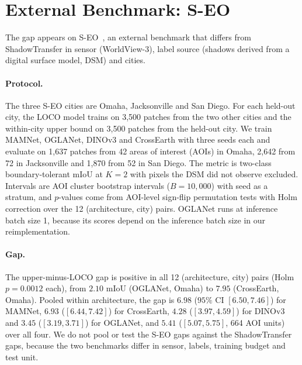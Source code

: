 \section{External Benchmark: S-EO}
\label{app:seo}

The gap appears on S-EO~\cite{seo}, an external benchmark that differs from ShadowTransfer
in sensor (WorldView-3), label source (shadows derived from a digital surface model, DSM)
and cities.

\paragraph{Protocol.} The three S-EO cities are Omaha, Jacksonville and San Diego. For each
held-out city, the LOCO model trains on 3,500 patches from the two other cities and the
within-city upper bound on 3,500 patches from the held-out city. We train MAMNet, OGLANet,
DINOv3 and CrossEarth with three seeds each and evaluate on 1,637 patches from 42 areas of
interest (AOIs) in Omaha, 2,642 from 72 in Jacksonville and 1,870 from 52 in San Diego. The
metric is two-class boundary-tolerant mIoU at $K{=}2$ with pixels the DSM did not observe
excluded. Intervals are AOI cluster bootstrap intervals ($B{=}10{,}000$) with seed as a
stratum, and $p$-values come from AOI-level sign-flip permutation tests with Holm correction
over the 12 (architecture, city) pairs. OGLANet runs at inference batch size 1, because its scores depend on
the inference batch size in our reimplementation.

\paragraph{Gap.} The upper-minus-LOCO gap is positive in all 12 (architecture, city) pairs
(Holm $p = 0.0012$ each), from $2.10$ mIoU (OGLANet, Omaha) to $7.95$ (CrossEarth, Omaha). Pooled within architecture, the gap is $6.98$ ($95\%$ CI
$[6.50, 7.46]$) for MAMNet, $6.93$ ($[6.44, 7.42]$) for CrossEarth, $4.28$ ($[3.97, 4.59]$)
for DINOv3 and $3.45$ ($[3.19, 3.71]$) for OGLANet, and $5.41$ ($[5.07, 5.75]$, 664 AOI
units) over all four. We do not pool or test the S-EO gaps against the ShadowTransfer gaps,
because the two benchmarks differ in sensor, labels, training budget and test unit.

